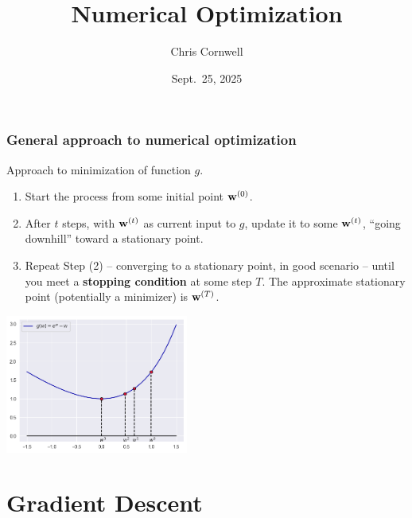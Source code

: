 \documentclass{beamer}
\author{Chris Cornwell}
\date{Sept.~25, 2025}
\title{Numerical Optimization}
\begin{document}
\begin{frame}
\titlepage
\end{frame}

\begin{frame}
\frametitle{General approach to numerical optimization}
    Approach to minimization of function $g$. 

    \pause
    \begin{enumerate}
        \item Start the process from some initial point ${\bf w}^{(0)}$.
        \pause
        \item After $t$ steps, with ${\bf w}^{(t)}$ as current input to $g$, update it to some ${\bf w}^{(t)}$, ``going downhill'' toward a stationary point. 
        \pause
        \item Repeat Step (2) {--} converging to a stationary point, in good scenario {--} until you meet a \textbf{stopping condition} at some step $T$. The approximate stationary point (potentially a minimizer) is ${\bf w}^{(T)}$.
    \end{enumerate}
    
    \centering 
    \includegraphics[width=0.45\textwidth]{../../Images/going-downhill.png}
\end{frame}

\section{Gradient Descent}
\end{document}
